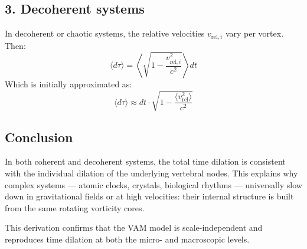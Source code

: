 \subsection*{3. Decoherent systems}

In decoherent or chaotic systems, the relative velocities \( v_{\text{rel}, i} \) vary per vortex. Then:
\begin{equation}
\langle d\tau \rangle = \left\langle \sqrt{1 - \frac{v_{\text{rel}, i}^2}{c^2}} \right\rangle dt
\end{equation}
Which is initially approximated as:
\begin{equation}
\langle d\tau \rangle \approx dt \cdot \sqrt{1 - \frac{\langle v_\text{rel}^2 \rangle}{c^2}} \label{eq:average_dil}
\end{equation}

\subsection*{Conclusion}

In both coherent and decoherent systems, the total time dilation is consistent with the individual dilation of the underlying vertebral nodes. This explains why complex systems — atomic clocks, crystals, biological rhythms — universally slow down in gravitational fields or at high velocities: their internal structure is built from the same rotating vorticity cores.

\vspace{1em}
\noindent
This derivation confirms that the VAM model is scale-independent and reproduces time dilation at both the micro- and macroscopic levels.